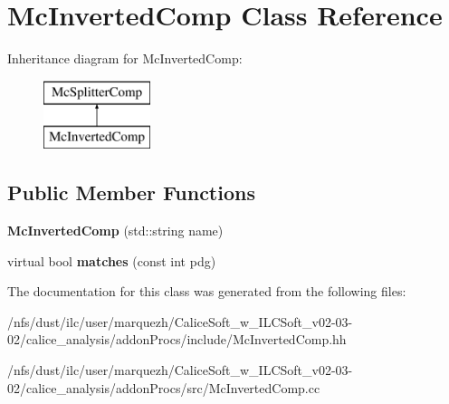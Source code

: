 \section{Mc\-Inverted\-Comp Class Reference}
\label{classMcInvertedComp}
Inheritance diagram for Mc\-Inverted\-Comp\-:\begin{figure}[H]
\begin{center}
\leavevmode
\includegraphics[height=2.000000cm]{classMcInvertedComp}
\end{center}
\end{figure}
\subsection*{Public Member Functions}
\begin{DoxyCompactItemize}
\item 
{\bfseries Mc\-Inverted\-Comp} (std\-::string name)\label{classMcInvertedComp_a0b9b203d745f4372de21fe11dcaac17e}

\item 
virtual bool {\bfseries matches} (const int pdg)\label{classMcInvertedComp_a83ce362b8040f1c685be622d7f0d2378}

\end{DoxyCompactItemize}


The documentation for this class was generated from the following files\-:\begin{DoxyCompactItemize}
\item 
/nfs/dust/ilc/user/marquezh/\-Calice\-Soft\-\_\-w\-\_\-\-I\-L\-C\-Soft\-\_\-v02-\/03-\/02/calice\-\_\-analysis/addon\-Procs/include/Mc\-Inverted\-Comp.\-hh\item 
/nfs/dust/ilc/user/marquezh/\-Calice\-Soft\-\_\-w\-\_\-\-I\-L\-C\-Soft\-\_\-v02-\/03-\/02/calice\-\_\-analysis/addon\-Procs/src/Mc\-Inverted\-Comp.\-cc\end{DoxyCompactItemize}
